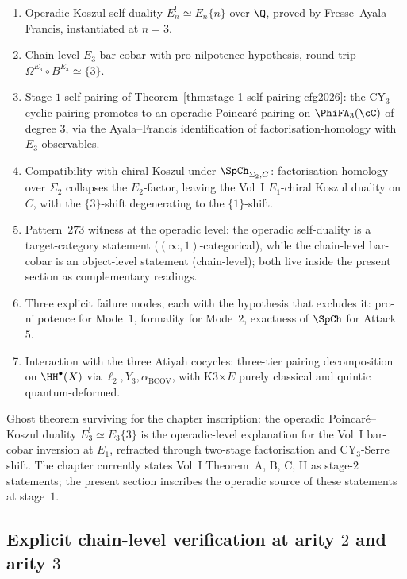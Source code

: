 \begin{enumerate}[label=\textup{(\arabic*)}]
  \item Operadic Koszul self-duality $E_n^! \simeq E_n\{n\}$ over $\Q$,
        proved by Fresse--Ayala--Francis, instantiated at $n = 3$.
  \item Chain-level $E_3$ bar-cobar with pro-nilpotence hypothesis,
        round-trip $\Omega^{E_3} \circ B^{E_3} \simeq \{3\}$.
  \item Stage-$1$ self-pairing of
        Theorem~\textup{\ref{thm:stage-1-self-pairing-cfg2026}}:
        the CY$_3$ cyclic pairing promotes to an operadic Poincar\'e
        pairing on $\PhiFA_3(\cC)$ of degree $3$, via the Ayala--Francis
        identification of factorisation-homology with $E_3$-observables.
  \item Compatibility with chiral Koszul under $\SpCh_{\Sigma_2, C}$:
        factorisation homology over $\Sigma_2$ collapses the
        $E_2$-factor, leaving the Vol~I $E_1$-chiral Koszul duality on
        $C$, with the $\{3\}$-shift degenerating to the $\{1\}$-shift.
  \item Pattern~$273$ witness at the operadic level: the operadic
        self-duality is a target-category statement
        ($(\infty,1)$-categorical), while the chain-level bar-cobar is
        an object-level statement (chain-level); both live inside the
        present section as complementary readings.
  \item Three explicit failure modes, each with the hypothesis that
        excludes it: pro-nilpotence for Mode~$1$, formality for
        Mode~$2$, exactness of $\SpCh$ for Attack~$5$.
  \item Interaction with the three Atiyah cocycles: three-tier pairing
        decomposition on $\HH^\bullet(X)$ via $\ell_2, Y_3,
        \alpha_{\mathrm{BCOV}}$, with K3$\times E$ purely classical and
        quintic quantum-deformed.
\end{enumerate}

Ghost theorem surviving for the chapter inscription: the operadic
Poincar\'e--Koszul duality $E_3^! \simeq E_3\{3\}$ is the
operadic-level explanation for the Vol~I bar-cobar inversion at
$E_1$, refracted through two-stage factorisation and CY$_3$-Serre
shift. The chapter currently states Vol~I Theorem~A, B, C, H as
stage-$2$ statements; the present section inscribes the operadic
source of these statements at stage~$1$.

\subsection*{Explicit chain-level verification at arity $2$ and arity $3$}

